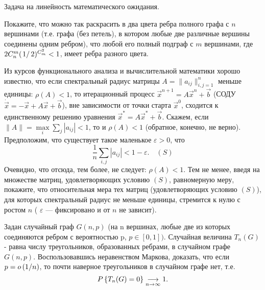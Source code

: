 \begin{ordre}
Задача на линейность математического ожидания.
\end{ordre}





\begin{problem}
Покажите, что можно так раскрасить в два цвета ребра полного графа с $n$ вершинами (т.е. графа (без петель), в котором любые две 
различные вершины соединены одним ребром), что любой его полный подграф с $m$ вершинами, где 
$2C_n^m (\left.1\right/2)^{C_m^2}<1$, имеет ребра разного цвета. 
\end{problem}


\begin{problem}
Из курсов функционального анализа и вычислительной математики хорошо известно, что если спектральный радиус матрицы 
$A=\| a_{ij}\|_{i,j=1}^{n}$ меньше единицы: $\rho(A)<1$, то итерационный процесс ${\vec x}^{n+1}=A{\vec x}^n +{\vec b}$ 
(СОДУ $\dot{\vec x}=-{\vec x}+A{\vec x}+{\vec b}$), вне зависимости от точки старта ${\vec x}^0$, 
сходится к единственному решению уравнения ${\vec x}^*=A{\vec x}^*+{\vec b}$. 
Скажем, если $\| A\|=\max\limits_{i} \sum\limits_j |a_{ij}|<1$, то и $\rho(A)<1$ (обратное, конечно, не верно). Предположим, что 
существует такое маленькое $\varepsilon>0$, что 
$$
\frac{1}{n}\sum\limits_{i,j} |a_{ij}|<1-\varepsilon . 
\quad (S)
$$
Очевидно, что отсюда, тем более, не следует: $\rho(A)<1$. 
Тем не менее, введя на множестве матриц, удовлетворяющих условию $(S)$, равномерную меру, покажите, что относительная мера тех матриц 
(удовлетворяющих условию $(S)$), для которых спектральный радиус не меньше единицы, стремится к нулю 
с ростом $n$ ( $\varepsilon$ --- фиксировано и от $n$ не зависит). 
\end{problem}


\begin{problem}
Задан случайный граф $G(n,p)$ (на n вершинах, любые две из которых 
соединяются ребром с вероятностью p, $p\in [0,1])$. Случайная величина $T_n 
(G)$ - равна числу треугольников, образованных ребрами, в случайном графе 
$G(n,p)$. Воспользовавшись неравенством Маркова, доказать, что если 
$p=o\left( {1 \mathord{\left/ {\vphantom {1 n}} \right. 
\kern-\nulldelimiterspace} n} \right)$, то почти наверное треугольников в 
случайном графе нет, т.е.
\[
P\left\{ {T_n (G)=0} 
\right\}\mathrel{\mathop{\kern0pt\longrightarrow}\limits_{n\to \infty }} 1.
\]
\end{problem}


